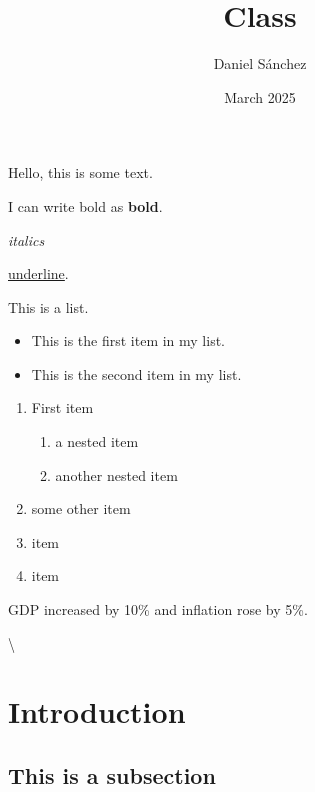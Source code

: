 \documentclass[12pt]{article} %
\title{Class} %
\author{Daniel Sánchez}
\date{March 2025}
\begin{document}

\maketitle %

\tableofcontents

Hello, this is some text.

I can write bold as \textbf{bold}. 

\textit{italics}

\underline{underline}.

This is a list. 

\begin{itemize}
    \item  This is the first item in my list.
    \item This is the second item in my list.
\end{itemize}

\begin{enumerate}
    \item First item
    \begin{enumerate}
        \item a nested item 
        \item another nested item
    \end{enumerate}
    \item some other item
    \item item
    \item item 
\end{enumerate}

\noindent \lipsum[1]

\vspace{0.5cm}

\lipsum[2]


GDP increased by 10\% and inflation rose by 5\%.

\textbackslash

\section{Introduction}

\lipsum 

\subsection{This is a subsection}
\end{document}
